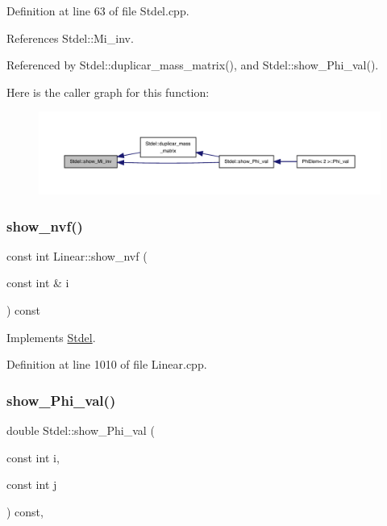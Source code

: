 Definition at line 63 of file Stdel.\+cpp.



References Stdel\+::\+Mi\+\_\+inv.



Referenced by Stdel\+::duplicar\+\_\+mass\+\_\+matrix(), and Stdel\+::show\+\_\+\+Phi\+\_\+val().

Here is the caller graph for this function\+:
\nopagebreak
\begin{figure}[H]
\begin{center}
\leavevmode
\includegraphics[width=350pt]{classStdel_a11bf2897170ada9a9dd8f641a39585e5_icgraph}
\end{center}
\end{figure}
\mbox{\label{classLinear_a9f907dbeb4f31d1633f7f5819093881f}} 
\subsubsection{\texorpdfstring{show\+\_\+nvf()}{show\_nvf()}}
{\footnotesize\ttfamily const int Linear\+::show\+\_\+nvf (\begin{DoxyParamCaption}\item[{const int \&}]{i }\end{DoxyParamCaption}) const\hspace{0.3cm}{\ttfamily [virtual]}}



Implements \hyperlink{classStdel_a2a504322269a749dd3c443d0e86c4a6c}{Stdel}.



Definition at line 1010 of file Linear.\+cpp.

\mbox{\label{classStdel_a6565c36150823a1f52a2daf05806f7a4}} 
\subsubsection{\texorpdfstring{show\+\_\+\+Phi\+\_\+val()}{show\_Phi\_val()}}
{\footnotesize\ttfamily double Stdel\+::show\+\_\+\+Phi\+\_\+val (\begin{DoxyParamCaption}\item[{const int}]{i,  }\item[{const int}]{j }\end{DoxyParamCaption}) const\hspace{0.3cm}{\ttfamily [inline]}, {\ttfamily [inherited]}}



